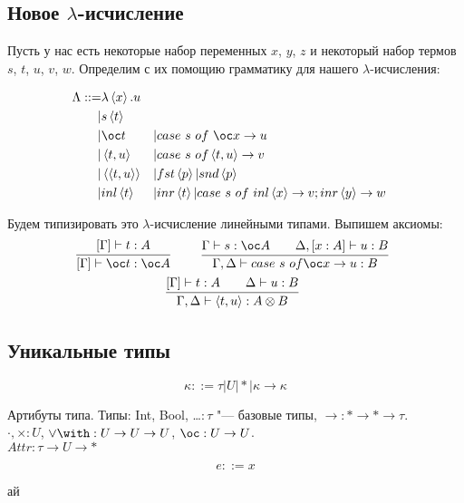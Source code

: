 \subsection{\texorpdfstring{Новое $\lambda$-исчисление}{}}
 Пусть у нас есть некоторые набор переменных $x$, $y$, $z$ и некоторый набор термов $s$, $t$, $u$, $v$, $w$.
 Определим с их помощию грамматику для нашего $\lambda$-исчисления:
\begin{bnf}
\begin{alignat*}{3}
	\Lambda ::= & \lambda\left<x\right>.u \\ 
			  | & s\left<t\right> \\
			  | & \oc t && | case~s~of~\oc x \rightarrow u \\
			  | & \left<t,u\right> && | case~s~of\left<t,u\right> \rightarrow v \\ 
			  | & \left<\left<t,u\right>\right> && | fst\left<p\right> | snd \left<p\right> \\ 
			  | & inl \left<t\right> && | inr \left<t\right>| case~s~of~inl\left<x\right> \rightarrow v; inr\left<y\right>\rightarrow w
\end{alignat*}
\end{bnf}
Будем типизировать это $\lambda$-исчисление линейными типами. Выпишем аксиомы:
\begin{gather*}
	\infer[]
		{\left[\Gamma\right]\vdash \oc t : \oc A}
		{\left[\Gamma\right]\vdash t : A}
	\qquad
	\infer[]
		{\Gamma, \Delta\vdash case~s~of \oc x \rightarrow u : B}
		{\Gamma\vdash s : \oc A && \Delta, \left[x : A\right]\vdash u : B}
	\\
	\infer[]
		{\Gamma, \Delta\vdash \left<t, u\right> : A \otimes B}
		{\left[\Gamma\right]\vdash t : A && \Delta\vdash u : B}
\end{gather*}


\subsection{\texorpdfstring{Уникальные типы}{Unique types}}

\begin{bnf}
\[
    \kappa ::= \tau | U | * | \kappa \rightarrow \kappa
\]
\end{bnf}

Артибуты типа.
Типы: Int, Bool, \ldots $: \tau$ "--- базовые типы, $\rightarrow : * \rightarrow * \rightarrow \tau$. \\
$\cdot, \times : U$, $\vee \with : U \rightarrow U \rightarrow U$, $\oc : U \rightarrow U$. \\
$Attr : \tau \rightarrow U \rightarrow *$

\begin{bnf}
\[
    e ::= x
\]
\end{bnf}

ай
